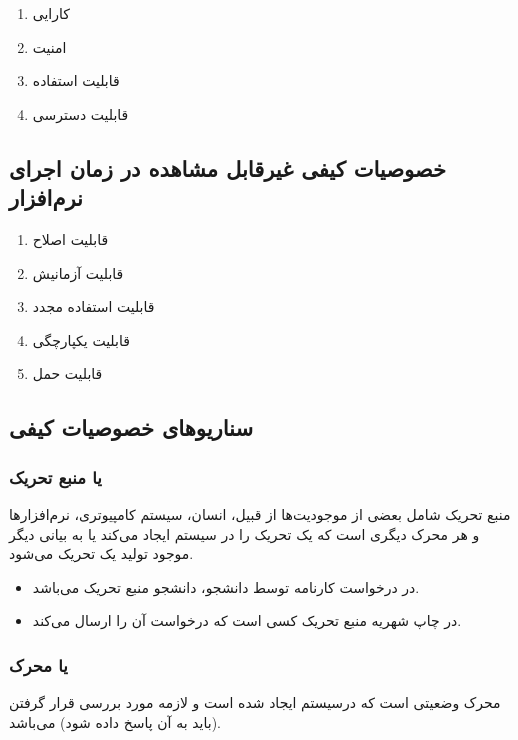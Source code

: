 \begin{enumerate}
    \item کارایی
    \item امنیت
    \item قابلیت استفاده
    \item قابلیت دسترسی
\end{enumerate}

\subsection{خصوصیات کیفی غیرقابل مشاهده در زمان اجرای نرم‌افزار}

\begin{enumerate}
    \item قابلیت اصلاح
    \item قابلیت آزمانیش
    \item قابلیت استفاده مجدد
    \item قابلیت یکپارچگی
    \item قابلیت حمل
\end{enumerate}

\subsection{سناریو‌های خصوصیات کیفی}

\subsubsection{ یا منبع تحریک}

منبع تحریک شامل بعضی از موجودیت‌ها از قبیل، انسان، سیستم کامپیوتری، نرم‌افزار‌ها
و هر محرک دیگری است که یک تحریک را در سیستم ایجاد می‌کند یا به بیانی دیگر موجود
تولید یک تحریک می‌شود.

\begin{itemize}
    \item در درخواست کارنامه توسط دانشجو، دانشجو منبع تحریک می‌باشد.
    \item در چاپ شهریه منبع تحریک کسی است که درخواست آن را ارسال می‌کند.
\end{itemize}

\subsubsection{ یا محرک}

محرک وضعیتی است که درسیستم ایجاد شده است و لازمه مورد بررسی قرار گرفتن (باید به
آن پاسخ داده شود) می‌باشد.

